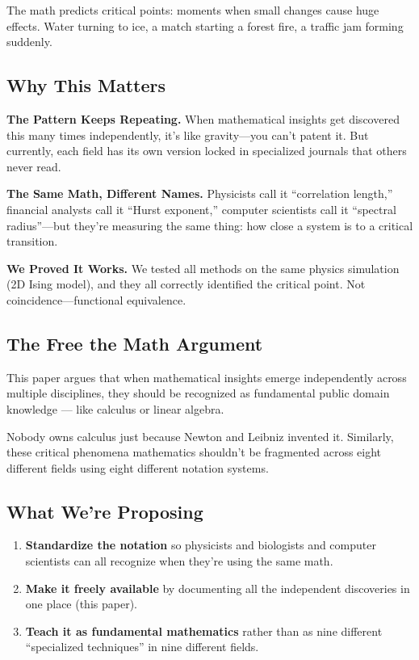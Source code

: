 \documentclass[11pt]{article}
\begin{document}
The math predicts critical points: moments when small changes cause huge effects. Water turning to ice, a match starting a forest fire, a traffic jam forming suddenly.

\subsection*{Why This Matters}

\textbf{The Pattern Keeps Repeating.} When mathematical insights get discovered this many times independently, it's like gravity---you can't patent it. But currently, each field has its own version locked in specialized journals that others never read.

\textbf{The Same Math, Different Names.} Physicists call it ``correlation length,'' financial analysts call it ``Hurst exponent,'' computer scientists call it ``spectral radius''---but they're measuring the same thing: how close a system is to a critical transition.

\textbf{We Proved It Works.} We tested all methods on the same physics simulation (2D Ising model), and they all correctly identified the critical point. Not coincidence---functional equivalence.

\subsection*{The Free the Math Argument}

This paper argues that when mathematical insights emerge independently across multiple disciplines, they should be recognized as fundamental public domain knowledge --- like calculus or linear algebra.

Nobody owns calculus just because Newton and Leibniz invented it. Similarly, these critical phenomena mathematics shouldn't be fragmented across eight different fields using eight different notation systems.

\subsection*{What We're Proposing}

\begin{enumerate}
    \item \textbf{Standardize the notation} so physicists and biologists and computer scientists can all recognize when they're using the same math.
    \item \textbf{Make it freely available} by documenting all the independent discoveries in one place (this paper).
    \item \textbf{Teach it as fundamental mathematics} rather than as nine different ``specialized techniques'' in nine different fields.
\end{enumerate}
\end{document}
